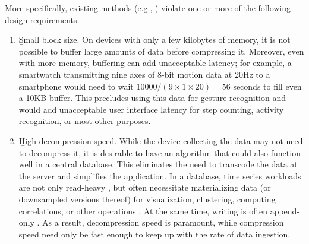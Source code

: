 More specifically, existing methods (e.g., \cite{sax, tsCompressSmartGrid, ecgCompressLossy, apca, lz4, zstd, zlib, gzip, lemireSegmentation}) violate one or more of the following design requirements:

\begin{enumerate}
\item \b{Small block size}. On devices with only a few kilobytes of memory, it is not possible to buffer large amounts of data before compressing it. Moreover, even with more memory, buffering can add unacceptable latency; for example, a smartwatch transmitting nine axes of 8-bit motion data at 20Hz to a smartphone would need to wait $10000 / (9 \times 1 \times 20) = 56$ seconds to fill even a 10KB buffer. This precludes using this data for gesture recognition and would add unacceptable user interface latency for step counting, activity recognition, or most other purposes.
\item \b{High decompression speed}. While the device collecting the data may not need to decompress it, it is desirable to have an algorithm that could also function well in a central database. This eliminates the need to transcode the data at the server and simplifies the application. In a database, time series workloads are not only read-heavy \cite{respawnDB, berkeleyTreeDB, influxDB}, but often necessitate materializing data (or downsampled versions thereof) for visualization, clustering, computing correlations, or other operations \cite{respawnDB}. At the same time, writing is often append-only \cite{gorilla, respawnDB}. As a result, decompression speed is paramount, while compression speed need only be fast enough to keep up with the rate of data ingestion.

\end{enumerate}
